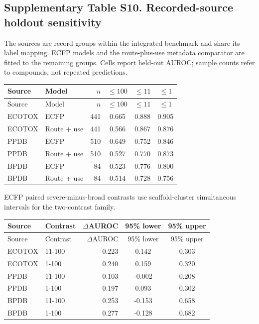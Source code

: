 \subsection*{Supplementary Table S10. Recorded-source holdout sensitivity}
The sources are record groups within the integrated benchmark and share its label mapping. ECFP models and the route-plus-use metadata comparator are fitted to the remaining groups. Cells report held-out AUROC; sample counts refer to compounds, not repeated predictions.
\begingroup\small\setlength{\tabcolsep}{4pt}
\begin{longtable}{llrccc}
\toprule Source & Model & $n$ & $\leq100$ & $\leq11$ & $\leq1$ \\ \midrule\endfirsthead
\toprule Source & Model & $n$ & $\leq100$ & $\leq11$ & $\leq1$ \\ \midrule\endhead
\bottomrule\endlastfoot
ECOTOX & ECFP & 441 & 0.665 & 0.888 & 0.905 \\
ECOTOX & Route + use & 441 & 0.566 & 0.867 & 0.876 \\
PPDB & ECFP & 510 & 0.649 & 0.752 & 0.846 \\
PPDB & Route + use & 510 & 0.527 & 0.770 & 0.873 \\
BPDB & ECFP & 84 & 0.523 & 0.776 & 0.800 \\
BPDB & Route + use & 84 & 0.514 & 0.728 & 0.756 \\
\end{longtable}
ECFP paired severe-minus-broad contrasts use scaffold-cluster simultaneous intervals for the two-contrast family.
\begin{longtable}{llrcc}
\toprule Source & Contrast & $\Delta$AUROC & 95\% lower & 95\% upper \\ \midrule\endfirsthead
\toprule Source & Contrast & $\Delta$AUROC & 95\% lower & 95\% upper \\ \midrule\endhead
\bottomrule\endlastfoot
ECOTOX & 11-100 & 0.223 & 0.142 & 0.303 \\
ECOTOX & 1-100 & 0.240 & 0.159 & 0.320 \\
PPDB & 11-100 & 0.103 & -0.002 & 0.208 \\
PPDB & 1-100 & 0.197 & 0.093 & 0.302 \\
BPDB & 11-100 & 0.253 & -0.153 & 0.658 \\
BPDB & 1-100 & 0.277 & -0.128 & 0.682 \\
\end{longtable}\endgroup
